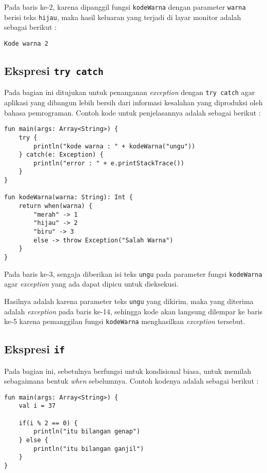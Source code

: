 Pada baris ke-2, karena dipanggil fungsi \texttt{kodeWarna} dengan parameter \texttt{warna} berisi teks \texttt{hijau}, maka hasil keluaran yang terjadi di layar monitor adalah sebagai berikut :

\begin{lstlisting}
Kode warna 2
\end{lstlisting}

\subsection{Ekspresi \texttt{try catch}}

Pada bagian ini ditujukan untuk penanganan \textit{exception} dengan \texttt{try catch} agar aplikasi yang dibangun lebih bersih dari informasi kesalahan yang diproduksi oleh bahasa pemrograman. Contoh kode untuk penjelasannya adalah sebagai berikut :

\begin{lstlisting}
fun main(args: Array<String>) {
	try {
		println("kode warna : " + kodeWarna("ungu"))
	} catch(e: Exception) {
		println("error : " + e.printStackTrace())
	}
}

fun kodeWarna(warna: String): Int {
	return when(warna) {
		"merah" -> 1
		"hijau" -> 2
		"biru" -> 3
		else -> throw Exception("Salah Warna")
	}
}
\end{lstlisting}

Pada baris ke-3, sengaja diberikan isi teks \texttt{ungu} pada parameter fungsi \texttt{kodeWarna} agar \textit{exception} yang ada dapat dipicu untuk dieksekusi.

Hasilnya adalah karena parameter teks \texttt{ungu} yang dikirim, maka yang diterima adalah \textit{exception} pada baris ke-14, sehingga kode akan langsung dilempar ke baris ke-5 karena pemanggilan fungsi \texttt{kodeWarna} menghasilkan \textit{exception} tersebut.

\subsection{Ekspresi \texttt{if}}

Pada bagian ini, sebetulnya berfungsi untuk kondisional biasa, untuk memilah sebagaimana bentuk \textit{when} sebelumnya. Contoh kodenya adalah sebagai berikut :

\begin{lstlisting}
fun main(args: Array<String>) {
	val i = 37
	
	if(i % 2 == 0) {
		println("itu bilangan genap")
	} else {
		println("itu bilangan ganjil")
	}
}
\end{lstlisting}

